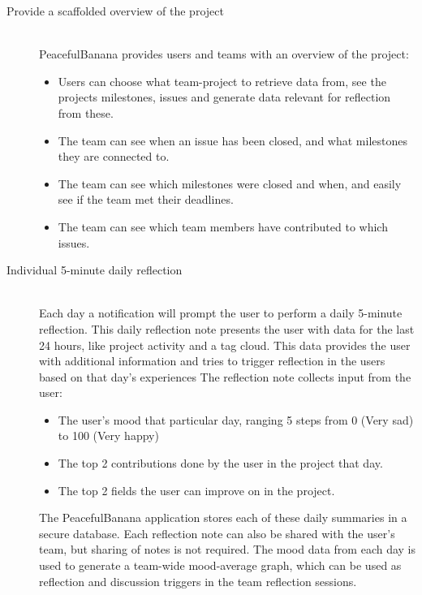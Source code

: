 \begin{description}
	\item[Provide a scaffolded overview of the project] \hfill \\
	PeacefulBanana provides users and teams with an overview of the project:
	\begin{itemize}
		\item Users can choose what team-project to retrieve data from, see the projects milestones, issues and generate data relevant for reflection from these.
		\item The team can see when an issue has been closed, and what milestones they are connected to.
		\item The team can see which milestones were closed and when, and easily see if the team met their deadlines. 
		\item The team can see which team members have contributed to which issues.
	\end{itemize}

	\item[Individual 5-minute daily reflection] \hfill \\
	Each day a notification will prompt the user to perform a daily 5-minute reflection. This daily reflection note presents the user with data for the last 24 hours, like project activity and a tag cloud. This data provides the user with additional information and tries to trigger reflection in the users based on that day's experiences The reflection note collects input from the user:
	\begin{itemize}
		\item The user's mood that particular day, ranging 5 steps from 0 (Very sad) to 100 (Very happy)
		\item The top 2 contributions done by the user in the project that day.
		\item The top 2 fields the user can improve on in the project.
	\end{itemize}
	The PeacefulBanana application stores each of these daily summaries in a secure database. Each reflection note can also be shared with the user's team, but sharing of notes is not required. The mood data from each day is used to generate a team-wide mood-average graph, which can be used as reflection and discussion triggers in the team reflection sessions.


\end{description}
